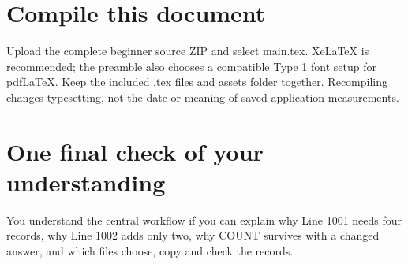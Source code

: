 \section{Compile this document}

Upload the complete beginner source ZIP and select main.tex. XeLaTeX is recommended; the preamble also chooses a compatible Type 1 font setup for pdfLaTeX. Keep the included .tex files and assets folder together. Recompiling changes typesetting, not the date or meaning of saved application measurements.

\section{One final check of your understanding}

You understand the central workflow if you can explain why Line 1001 needs four records, why Line 1002 adds only two, why COUNT survives with a changed answer, and which files choose, copy and check the records.